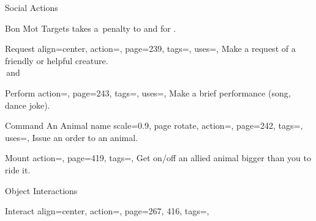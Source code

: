 \begin{PageBackLandscape}
\begin{TablesHalf}{\backTableHeight}
\begin{Table}{Social Actions}
\begin{entry}{Bon Mot}
                Targets takes a \,\Status penalty to \PerceptionT and \WillT {} for .
                \hfill {}
            \end{entry}
            \breakLine
            \begin{entry}{Request}{%
                align=center,
                action=,
                page=239,
                tags=\Concentrate\Mental,
                uses=\Diplomacy,
            }
                Make a request of a friendly or helpful creature.\hfill {}\\
                \Auditory\,and \Linguistic\hfill{}\quad {}
            \end{entry}
            \begin{entry}{Perform}{%
                action=,
                page=243,
                tags=\Concentrate,
                uses=\Performance,
            }
                Make a brief performance (song, dance joke).\hfill{}\quad {}
            \end{entry}
            \breakLine
            \begin{entry}{Command An Animal}{%
                name scale=0.9,
                page rotate,
                action=\!,
                page=242,
                tags=\Concentrate,
                uses=\NatureWill,
            }
                Issue an order to an animal. \Auditory\hfill {}
            \end{entry}
            \begin{entry}{Mount}{%
                action=,
                page=419,
                tags=\Move,
            }
                Get on/off an allied animal bigger than you to ride it.
            \end{entry}
        \end{Table}%
        \TableSpace
        \begin{Table}{Object Interactions}
            \begin{entry}{Interact}{%
                align=center,
                action=,
                page={267, 416},
                tags=\Manipulate,
            }%
                \renewcommand{\arraystretch}{1}%
                \setlength{\tabcolsep}{6pt}%
                \begin{tabularx}{\linewidth}{@{}lll}%

\end{tabularx}
\end{entry}
\end{Table}
\end{TablesHalf}
\end{PageBackLandscape}
